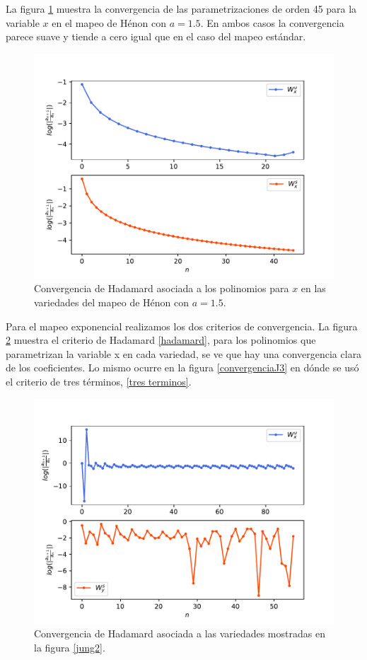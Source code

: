 La figura \ref{convergenciaHenon1} muestra la convergencia de las parametrizaciones de orden 45 para la variable $x$ en el mapeo de Hénon con $a=1.5$. En ambos casos la convergencia parece suave y tiende a cero igual que en el caso del mapeo estándar.

\begin{figure}[H]
\centering
\includegraphics[scale=0.5]{converHenon1}
\caption{Convergencia de Hadamard asociada a los polinomios para $x$ en las variedades del mapeo de Hénon con $a=1.5$.}
\label{convergenciaHenon1}
\end{figure}


Para el mapeo exponencial realizamos los dos criterios de convergencia. La figura \ref{convergenciaJH} muestra el criterio de Hadamard \ref{hadamard}, para los polinomios que parametrizan la variable x en cada variedad, se ve que hay una convergencia clara de los coeficientes. Lo mismo ocurre en la figura \ref{convergenciaJ3} en dónde se usó el criterio de tres términos, \ref{tres terminos}.

\begin{figure}[H]
\centering
\includegraphics[scale=0.5]{convergenciaJungH57}
\caption{Convergencia de Hadamard asociada a las variedades mostradas en la figura \ref{jung2}.}
\label{convergenciaJH}
\end{figure}



